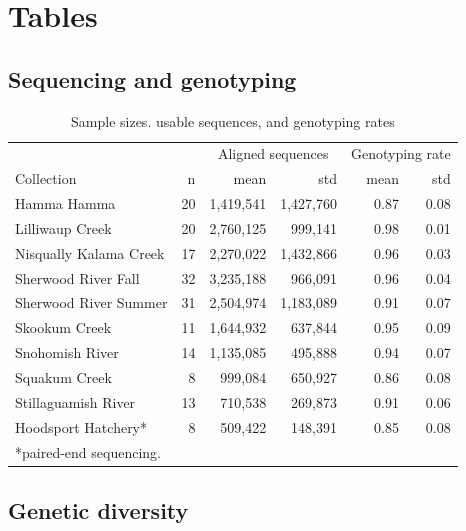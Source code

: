 \documentclass[12pt, one column]{article}
\begin{document}
\section*{Tables}

\subsection*{Sequencing and genotyping}

\begin{table}[H]
\caption{\label{tab:table-name}Sample sizes. usable sequences, and genotyping rates}

\begin{tabular}{lrrrrr}
\toprule
{} & {} & \multicolumn{2}{c}{Aligned sequences} & \multicolumn{2}{c}{Genotyping rate}\\
Collection &  n   &            mean &        std &              mean &       std \\
\midrule
Hamma Hamma            &  20 &         1,419,541 & 1,427,760 &            0.87 &       0.08 \\
Lilliwaup Creek        &  20 &         2,760,125 &   999,141 &            0.98 &       0.01 \\
Nisqually Kalama Creek &  17 &         2,270,022 & 1,432,866 &            0.96 &       0.03 \\
Sherwood River Fall    &  32 &         3,235,188 &   966,091 &            0.96 &       0.04 \\
Sherwood River Summer  &  31 &         2,504,974 & 1,183,089 &            0.91 &       0.07 \\
Skookum Creek          &  11 &         1,644,932 &   637,844 &            0.95 &       0.09 \\
Snohomish River        &  14 &         1,135,085 &   495,888 &            0.94 &       0.07 \\
Squakum Creek          &   8 &           999,084 &   650,927 &            0.86 &       0.08 \\
Stillaguamish River    &  13 &           710,538 &   269,873 &            0.91 &       0.06 \\
Hoodsport Hatchery*    &   8 &           509,422 &   148,391 &            0.85 &       0.08 \\
\bottomrule
\multicolumn{6}{l}{*paired-end sequencing.}
\end{tabular}

\end {table}

\subsection*{Genetic diversity} 
\end{document}
